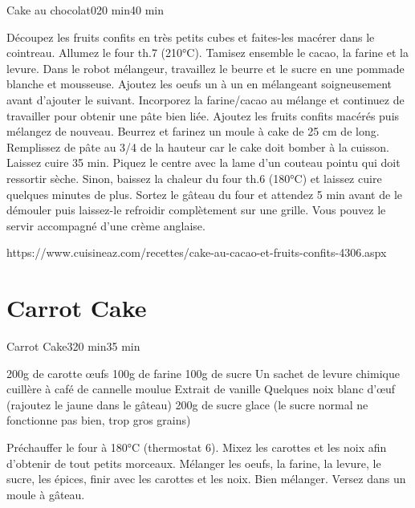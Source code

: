 {\begin{recette}{Cake au chocolat}{0}{20 min}{40 min}
\begin{preparation}
\etape Découpez les fruits confits en très petits cubes et faites-les macérer dans le cointreau.
\etape Allumez le four th.7 (210°C).
\etape Tamisez ensemble le cacao, la farine et la levure.
\etape Dans le robot mélangeur, travaillez le beurre et le sucre en une pommade blanche et mousseuse.
\etape Ajoutez les oeufs un à un en mélangeant soigneusement avant d'ajouter le suivant.
\etape Incorporez la farine/cacao au mélange et continuez de travailler pour obtenir une pâte bien liée.
\etape Ajoutez les fruits confits macérés puis mélangez de nouveau.
\etape Beurrez et farinez un moule à cake de 25 cm de long.
\etape Remplissez de pâte au 3/4 de la hauteur car le cake doit bomber à la cuisson.
\etape Laissez cuire 35 min.
\etape Piquez le centre avec la lame d'un couteau pointu qui doit ressortir sèche. Sinon, baissez la chaleur du four th.6 (180°C) et laissez cuire quelques minutes de plus.
\etape Sortez le gâteau du four et attendez 5 min avant de le démouler puis laissez-le refroidir complètement sur une grille.
\etape Vous pouvez le servir accompagné d'une crème anglaise.


\end{preparation}

\begin{cuisson}
https://www.cuisineaz.com/recettes/cake-au-cacao-et-fruits-confits-4306.aspx
\end{cuisson}
\end{recette}

\section{Carrot Cake}
\begin{recette}{Carrot Cake}{3}{20 min}{35 min}
\begin{ingredients}
\ingredient 200g de carotte
 œufs
\ingredient 100g de farine
\ingredient 100g de sucre
\ingredient Un sachet de levure chimique
 cuillère à café de cannelle moulue
\ingredient Extrait de vanille
\ingredient Quelques noix
 blanc d'œuf (rajoutez le jaune dans le gâteau)
\ingredient 200g de sucre glace (le sucre normal ne fonctionne pas bien, trop gros grains)
\end{ingredients}

\begin{preparation}
\etape Préchauffer le four à 180°C (thermostat 6).
\etape Mixez les carottes et les noix afin d'obtenir de tout petits morceaux.
\etape Mélanger les oeufs, la farine, la levure, le sucre, les épices, finir avec les carottes et les noix.
\etape Bien mélanger.
\etape Versez dans un moule à gâteau.
\end{preparation}


\end{recette}}
